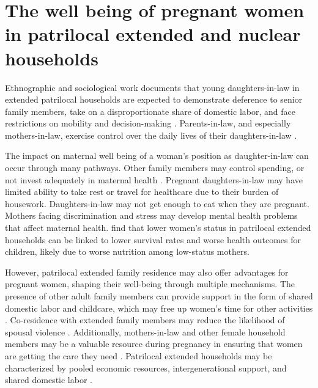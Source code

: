 \documentclass[10pt,twoside,reqno]{article}
\begin{document}
\section*{The well being of pregnant women in patrilocal extended and nuclear households}

Ethnographic and sociological work documents that young daughters-in-law in extended patrilocal households are expected to demonstrate deference to senior family members, take on a disproportionate share of domestic labor, and face restrictions on mobility and decision-making \citep{mandelbaum1988women, jeffery1989labour, gupta1999lifeboat}.  Parents-in-law, and especially mothers-in-law, exercise control over the daily lives of their daughters-in-law \citep{desai2005women, bloom2001dimensions}. 

The impact on maternal well being of a woman's position as daughter-in-law can occur through many pathways. Other family members may control spending, or not invest adequately in maternal health \citep{ganle2015intra,raj2011abuse}. Pregnant daughters-in-law may have limited ability to take rest or travel for healthcare due to their burden of housework. Daughters-in-law may not get enough to eat when they are pregnant. Mothers facing discrimination and stress may develop mental health problems that affect maternal health. \cite{coffey2022mothers} find that lower women’s status in patrilocal extended households can be linked to lower survival rates and worse health outcomes for children, likely due to worse nutrition among low-status mothers.

However, patrilocal extended family residence may also offer advantages for pregnant women, shaping their well-being through multiple mechanisms.  The presence of other adult family members can provide support in the form of shared domestic labor and childcare, which may free up women’s time for other activities \citep{khanna2024role}. Co-residence with extended family members may reduce the likelihood of spousal violence \citep{khanna2024role, khalil2019patrilocal, allendorf2013going}. Additionally, mothers-in-law and other female household members may be a valuable resource during pregnancy in ensuring that women are getting the care they need \citep{varghese2019coresidence}.  Patrilocal extended households may be characterized by pooled economic resources, intergenerational support, and shared domestic labor \citep{wadley1988karimpur}.  
\end{document}
